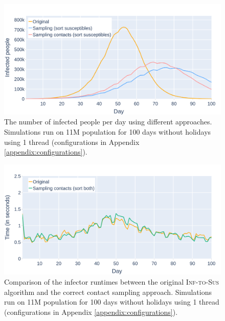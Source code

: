 \begin{figure}
    \centering
    \includegraphics[width=\linewidth]{4 - Sampling/fig/inf_to_sus/its_infections_sampling_contacts.png}
    \caption{The number of infected people per day using different approaches. Simulations run on 11M population for 100 days without holidays using 1 thread (configurations in Appendix \ref{appendix:configurations}).}
    \label{fig:its_infections_sampling_contacts}
\end{figure}

\begin{figure}
    \centering
    \includegraphics[width=\linewidth]{4 - Sampling/fig/inf_to_sus/its_infectors_sampling_contacts.png}
    \caption{Comparison of the infector runtimes between the original \textsc{Inf-to-Sus} algorithm and the correct contact sampling approach. Simulations run on 11M population for 100 days without holidays using 1 thread (configurations in Appendix \ref{appendix:configurations}).}
    \label{fig:its_infector_sampling_contacts}
\end{figure}

